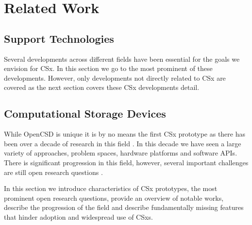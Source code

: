 
\chapter{Related Work} %



\ifpdf
    \graphicspath{{7/figures/PNG/}{7/figures/PDF/}{7/figures/}}
\else
    \graphicspath{{7/figures/EPS/}{7/figures/}}
\fi


% 

\section{Support Technologies}

Several developments across different fields have been essential for the
goals we envision for CSx. In this section we go to the most prominent of 
these developments. However, only developments not directly related to CSx are
covered as the next section covers these CSx developments detail.

\section{Computational Storage Devices}

While OpenCSD is unique it is by no means the first CSx prototype as there
has been over a decade of research in this field \cite{lukken2021past}. In this
decade we have seen a large variety of approaches, problem spaces, hardware
platforms and software APIs. There is significant progression in this field, 
however, several important challenges are still open research
questions \cite{barbalacecomputational}.

In this section we introduce characteristics of CSx prototypes, the most
prominent open research questions, provide an overview of notable works,
describe the progression of the field and describe fundamentally missing
features that hinder adoption and widespread use of CSxs.




